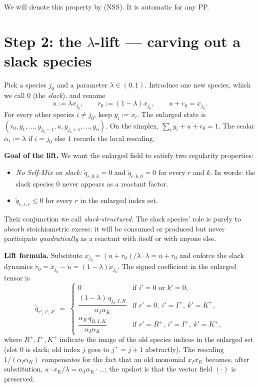 \documentclass[11pt]{article}
\begin{document}
We will denote this property by (NSS). It is automatic for any PP.

\section{Step 2: the $\lambda$-lift --- carving out a slack species}
\label{sec:lambda}

Pick a species $j_0$ and a parameter $\lambda \in (0,1)$. Introduce one
new species, which we call $0$ (the \emph{slack}), and rename
\[
   u := \lambda x_{j_0}, \qquad
   r_0 := (1-\lambda) x_{j_0}, \qquad
   u + r_0 = x_{j_0}.
\]
For every other species $i \ne j_0$, keep $y_i := x_i$. The enlarged
state is $(r_0, y_1, \dots, y_{j_0-1}, u, y_{j_0+1}, \dots, y_n)$. On the
simplex, $\sum_i y_i + u + r_0 = 1$. The scalar $\alpha_i := \lambda$ if
$i = j_0$ else $1$ records the local rescaling.

\textbf{Goal of the lift.} We want the enlarged field to satisfy two
regularity properties:
\begin{itemize}
\item[(NSM)] \emph{No Self-Mix on slack:} $\widetilde q_{r, 0, k} = 0$
   and $\widetilde q_{r, k, 0} = 0$ for every $r$ and $k$. In words: the
   slack species $0$ never appears as a reactant factor.
\item[(NSS)] $\widetilde q_{r,r,r} \le 0$ for every $r$ in the enlarged
   index set.
\end{itemize}
Their conjunction we call \emph{slack-structured}. The slack species'
role is purely to absorb stoichiometric excess: it will be consumed or
produced but never participate \emph{quadratically} as a reactant with
itself or with anyone else.

\textbf{Lift formula.} Substitute $x_{j_0} = (u + r_0)/\lambda \cdot \lambda
= u + r_0$ and enforce the slack dynamics
$\dot r_0 = \dot x_{j_0} - \dot u = (1-\lambda) \dot x_{j_0}$.
The signed coefficient in the enlarged tensor is
\begin{equation}
\widetilde q_{r',\,i',\,k'} \;=\;
\begin{cases}
   0 & \text{if } i' = 0 \text{ or } k' = 0,\\[2pt]
   \dfrac{(1-\lambda)\, q_{j_0, I, K}}{\alpha_I \alpha_K}
      & \text{if } r' = 0,\ i' = I^+,\ k' = K^+,\\[6pt]
   \dfrac{\alpha_R\, q_{R, I, K}}{\alpha_I \alpha_K}
      & \text{if } r' = R^+,\ i' = I^+,\ k' = K^+,
\end{cases}
\tag{$\Lambda$}
\end{equation}
where $R^+, I^+, K^+$ indicate the image of the old species indices in
the enlarged set (slot $0$ is slack; old index $j$ goes to $j^+ = j+1$
abstractly). The rescaling $1/(\alpha_I \alpha_K)$ compensates for the
fact that an old monomial $x_I x_K$ becomes, after substitution,
$u \cdot x_K / \lambda = \alpha_I \alpha_K \cdot \ldots$; the upshot is
that the vector field $\dot{(\cdot)}$ is preserved.
\end{document}

